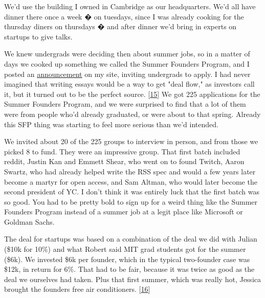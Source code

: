 We'd use the building I owned in
                  Cambridge as our headquarters. We'd all have dinner there once
                  a week � on tuesdays, since I was already cooking for the
                  thursday diners on thursdays � and after dinner we'd bring in
                  experts on startups to give talks.

We knew
                  undergrads were deciding then about summer jobs, so in a
                  matter of days we cooked up something we called the Summer
                  Founders Program, and I posted an
                  \href{http://www.paulgraham.com/summerfounder.html}{\underline{announcement}}
                  on my site, inviting undergrads to apply. I had never imagined
                  that writing essays would be a way to get "deal flow," as
                  investors call it, but it turned out to be the perfect source.
                  [\href{\#f15n}{15}]
                  We got 225 applications for the Summer Founders Program, and
                  we were surprised to find that a lot of them were from people
                  who'd already graduated, or were about to that spring. Already
                  this SFP thing was starting to feel more serious than we'd
                  intended.

We invited about 20 of the 225 groups to
                  interview in person, and from those we picked 8 to fund. They
                  were an impressive group. That first batch included reddit,
                  Justin Kan and Emmett Shear, who went on to found Twitch,
                  Aaron Swartz, who had already helped write the RSS spec and
                  would a few years later become a martyr for open access, and
                  Sam Altman, who would later become the second president of YC.
                  I don't think it was entirely luck that the first batch was so
                  good. You had to be pretty bold to sign up for a weird thing
                  like the Summer Founders Program instead of a summer job at a
                  legit place like Microsoft or Goldman Sachs.

The
                  deal for startups was based on a combination of the deal we
                  did with Julian (\$10k for 10\%) and what Robert said MIT grad
                  students got for the summer (\$6k). We invested \$6k per
                  founder, which in the typical two-founder case was \$12k, in
                  return for 6\%. That had to be fair, because it was twice as
                  good as the deal we ourselves had taken. Plus that first
                  summer, which was really hot, Jessica brought the founders
                  free air conditioners.
                  [\href{\#f16n}{16}]

